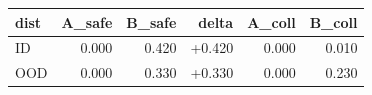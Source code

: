 \begin{tabular}{lrrrrr}
\toprule
dist & A_safe & B_safe & delta & A_coll & B_coll \\
\midrule
ID & 0.000 & 0.420 & +0.420 & 0.000 & 0.010 \\
OOD & 0.000 & 0.330 & +0.330 & 0.000 & 0.230 \\
\bottomrule
\end{tabular}
